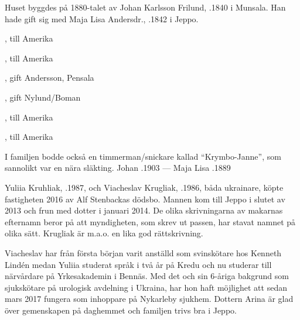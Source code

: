 Huset byggdes på 1880-talet av Johan Karlsson Frilund, .1840 i Munsala. Han hade gift sig med Maja Lisa Andersdr., .1842 i Jeppo.
\begin{jhchildren}
  \item {}, till Amerika
  \item {}, till Amerika
  \item {}
  \item {}, gift Andersson, Pensala
  \item {}, gift Nylund/Boman
  \item {}, till Amerika
  \item {}, till Amerika
\end{jhchildren}
I familjen bodde också en timmerman/snickare kallad ``Krymbo-Janne'', som sannolikt var en nära släkting.
Johan .1903  ---  Maja Lisa .1889





Yuliia Kruhliak, .1987, och Viacheslav Krugliak, .1986, båda ukrainare, köpte fastigheten 2016 av Alf Stenbackas dödsbo. Mannen kom till Jeppo i slutet av 2013 och frun med dotter i januari 2014. De olika skrivningarna av makarnas efternamn beror på att myndigheten, som skrev ut passen, har stavat namnet på olika sätt. Krugliak är m.a.o. en lika god rättskrivning.
\begin{jhchildren}
  \item {}
\end{jhchildren}
Viacheslav har från första början varit anställd som svinskötare hos Kenneth Lindén medan Yuliia studerat språk i två år på Kredu och nu studerar till närvårdare på Yrkesakademin i Bennäs. Med det och sin 6-åriga bakgrund som sjukskötare på urologisk avdelning i Ukraina, har hon haft möjlighet att sedan mars 2017 fungera som inhoppare på Nykarleby sjukhem. Dottern Arina är glad över gemenskapen på daghemmet och familjen trivs bra i Jeppo.


